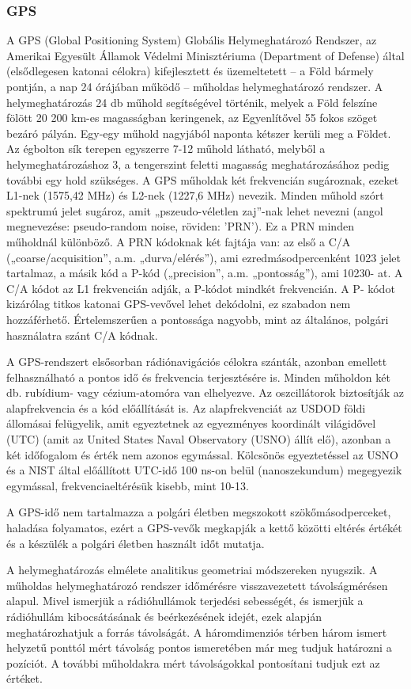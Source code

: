\subsubsection{GPS}
A GPS (Global Positioning System) Globális Helymeghatározó Rendszer, az
Amerikai Egyesült Államok Védelmi Minisztériuma (Department of Defense)
által (elsődlegesen katonai célokra) kifejlesztett és üzemeltetett – a Föld bármely
pontján, a nap 24 órájában működő – műholdas helymeghatározó rendszer.
A helymeghatározás 24 db műhold segítségével történik, melyek a Föld felszíne
fölött 20 200 km-es magasságban keringenek, az Egyenlítővel 55 fokos szöget
bezáró pályán. Egy-egy műhold nagyjából naponta kétszer kerüli meg a Földet.
Az égbolton sík terepen egyszerre 7-12 műhold látható, melyből a
helymeghatározáshoz 3, a tengerszint feletti magasság meghatározásához pedig
további egy hold szükséges. A GPS műholdak két frekvencián sugároznak,
ezeket L1-nek (1575,42 MHz) és L2-nek (1227,6 MHz) nevezik. Minden
műhold szórt spektrumú jelet sugároz, amit „pszeudo-véletlen zaj”-nak lehet
nevezni (angol megnevezése: pseudo-random noise, röviden: 'PRN'). Ez a PRN
minden műholdnál különböző. A PRN kódoknak két fajtája van: az első a C/A
(„coarse/acquisition”, a.m. „durva/elérés”), ami ezredmásodpercenként 1023
jelet tartalmaz, a másik kód a P-kód („precision”, a.m. „pontosság”), ami 10230-
at. A C/A kódot az L1 frekvencián adják, a P-kódot mindkét frekvencián. A P-
kódot kizárólag titkos katonai GPS-vevővel lehet dekódolni, ez szabadon nem
hozzáférhető. Értelemszerűen a pontossága nagyobb, mint az általános, polgári
használatra szánt C/A kódnak.

A GPS-rendszert elsősorban rádiónavigációs célokra szánták, azonban emellett
felhasználható a pontos idő és frekvencia terjesztésére is. Minden műholdon két
db. rubídium- vagy cézium-atomóra van elhelyezve. Az oszcillátorok biztosítják
az alapfrekvencia és a kód előállítását is. Az alapfrekvenciát az USDOD földi
állomásai felügyelik, amit egyeztetnek az egyezményes koordinált világidővel
(UTC) (amit az United States Naval Observatory (USNO) állít elő), azonban a
két időfogalom és érték nem azonos egymással. Kölcsönös egyeztetéssel az
USNO és a NIST által előállított UTC-idő 100 ns-on belül (nanoszekundum)
megegyezik egymással, frekvenciaeltérésük kisebb, mint 10-13.

A GPS-idő nem tartalmazza a polgári életben megszokott szökőmásodperceket,
haladása folyamatos, ezért a GPS-vevők megkapják a kettő közötti eltérés
értékét és a készülék a polgári életben használt időt mutatja.

A helymeghatározás elmélete analitikus geometriai módszereken nyugszik. A
műholdas helymeghatározó rendszer időmérésre visszavezetett távolságmérésen
alapul. Mivel ismerjük a rádióhullámok terjedési sebességét, és ismerjük a
rádióhullám kibocsátásának és beérkezésének idejét, ezek alapján meghatározhatjuk a forrás távolságát. A háromdimenziós térben három ismert
helyzetű ponttól mért távolság pontos ismeretében már meg tudjuk határozni a
pozíciót. A további műholdakra mért távolságokkal pontosítani tudjuk ezt az
értéket.
